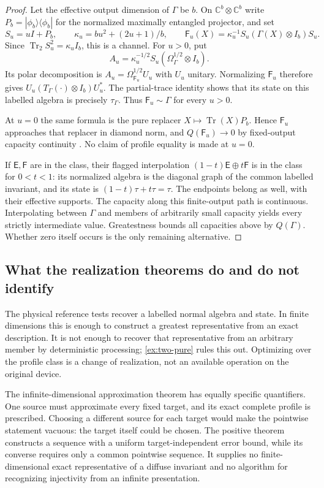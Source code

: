 \documentclass[11pt,reqno]{amsart}
\theoremstyle{definition}
\theoremstyle{remark}
\numberwithin{equation}{section}
\DeclareMathOperator{\Tr}{Tr}
\newcommand{\E}{\mathsf E}
\newcommand{\F}{\mathsf F}
\begin{document}
\begin{proof}
Let the effective output dimension of $\Gamma$ be $b$. On $\mathbb C^b\otimes\mathbb C^b$ write $P_b=|\phi_b\rangle\langle\phi_b|$ for the normalized maximally entangled projector, and set
\[
 S_u=uI+P_b,\qquad
 \kappa_u=bu^2+(2u+1)/b,\qquad
 \F_u(X)=\kappa_u^{-1}S_u(\Gamma(X)\otimes I_b)S_u.
\]
Since $\Tr_2S_u^2=\kappa_u I_b$, this is a channel. For $u>0$, put
\[
 A_u=\kappa_u^{-1/2}S_u(\Omega_\Gamma^{1/2}\otimes I_b).
\]
Its polar decomposition is $A_u=\Omega_{\F_u}^{1/2}U_u$ with $U_u$ unitary. Normalizing $\F_u$ therefore gives $U_u(T_\Gamma(\cdot)\otimes I_b)U_u^*$. The partial-trace identity shows that its state on this labelled algebra is precisely $\tau_\Gamma$. Thus $\F_u\sim\Gamma$ for every $u>0$.

At $u=0$ the same formula is the pure replacer $X\mapsto\Tr(X)P_b$. Hence $\F_u$ approaches that replacer in diamond norm, and $Q(\F_u)\to0$ by fixed-output capacity continuity \cite[Corollary~14]{LeungSmith}. No claim of profile equality is made at $u=0$.

If $\E,\F$ are in the class, their flagged interpolation $(1-t)\E\oplus t\F$ is in the class for $0<t<1$: its normalized algebra is the diagonal graph of the common labelled invariant, and its state is $(1-t)\tau+t\tau=\tau$. The endpoints belong as well, with their effective supports. The capacity along this finite-output path is continuous. Interpolating between $\Gamma$ and members of arbitrarily small capacity yields every strictly intermediate value. Greatestness bounds all capacities above by $Q(\Gamma)$. Whether zero itself occurs is the only remaining alternative.
\end{proof}

\subsection{What the realization theorems do and do not identify}

The physical reference tests recover a labelled normal algebra and state. In finite dimensions this is enough to construct a greatest representative from an exact description. It is not enough to recover that representative from an arbitrary member by deterministic processing; \cref{ex:two-pure} rules this out. Optimizing over the profile class is a change of realization, not an available operation on the original device.

The infinite-dimensional approximation theorem has equally specific quantifiers. One source must approximate every fixed target, and its exact complete profile is prescribed. Choosing a different source for each target would make the pointwise statement vacuous: the target itself could be chosen. The positive theorem constructs a sequence with a uniform target-independent error bound, while its converse requires only a common pointwise sequence. It supplies no finite-dimensional exact representative of a diffuse invariant and no algorithm for recognizing injectivity from an infinite presentation.
\end{document}
